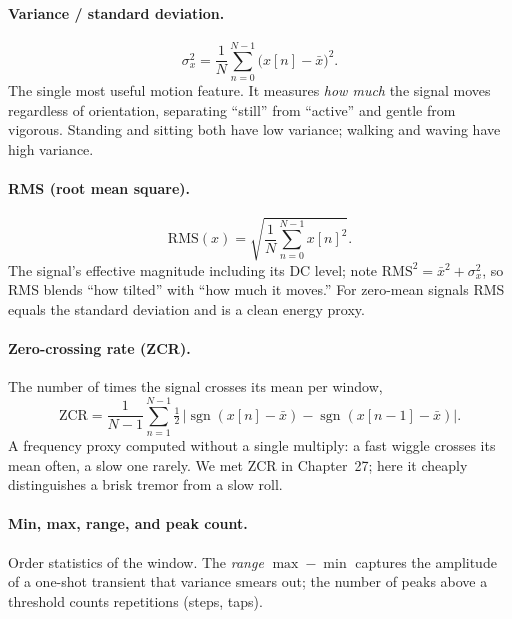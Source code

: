 \paragraph{Variance / standard deviation.}
\begin{equation}
\label{ch38:variance}
  \sigma_x^2 = \frac{1}{N}\sum_{n=0}^{N-1}\big(x[n]-\bar{x}\big)^2 .
\end{equation}
The single most useful motion feature. It measures \emph{how much} the signal
moves regardless of orientation, separating ``still'' from ``active'' and gentle
from vigorous. Standing and sitting both have low variance; walking and waving
have high variance.

\paragraph{RMS (root mean square).}
\begin{equation}
\label{ch38:rms}
  \mathrm{RMS}(x) = \sqrt{\frac{1}{N}\sum_{n=0}^{N-1} x[n]^2}.
\end{equation}
The signal's effective magnitude including its DC level; note
$\mathrm{RMS}^2 = \bar{x}^2 + \sigma_x^2$, so RMS blends ``how tilted'' with
``how much it moves.'' For zero-mean signals RMS equals the standard deviation and
is a clean energy proxy.

\paragraph{Zero-crossing rate (ZCR).} The number of times the signal crosses its
mean per window,
\begin{equation}
\label{ch38:zcr}
  \mathrm{ZCR} = \frac{1}{N-1}\sum_{n=1}^{N-1}
     \tfrac12\,\big| \operatorname{sgn}(x[n]-\bar x) - \operatorname{sgn}(x[n-1]-\bar x)\big|.
\end{equation}
A frequency proxy computed without a single multiply: a fast wiggle
crosses its mean often, a slow one rarely. We met ZCR in Chapter~27; here it cheaply distinguishes a brisk tremor from a slow roll.

\paragraph{Min, max, range, and peak count.} Order statistics of the window. The
\emph{range} $\max - \min$ captures the amplitude of a one-shot transient that
variance smears out; the number of peaks above a threshold counts repetitions
(steps, taps).

